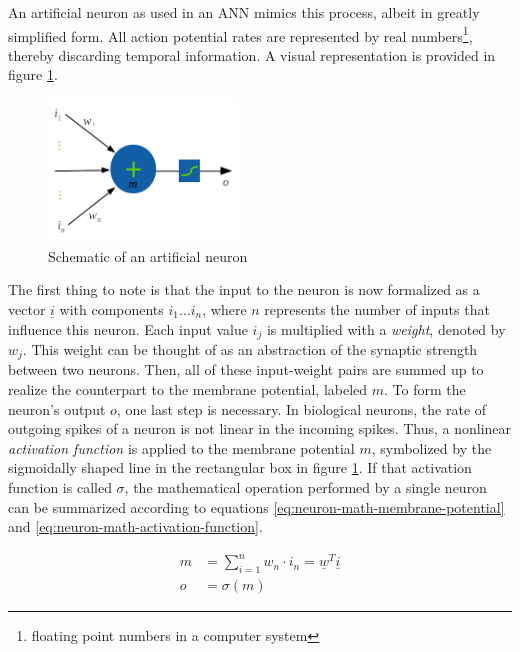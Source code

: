 \documentclass[11pt, a4paper]{article}
\newcommand\braces[1]{\left(#1\right)}
\renewcommand{\vec}[1]{\underline{#1}}
\begin{document}
An artificial neuron as used in an ANN mimics this process, albeit in greatly simplified form. All action potential rates are represented by real numbers\footnote{floating point numbers in a computer system}, thereby discarding temporal information. A visual representation is provided in figure \ref{fig:artificial-neuron-schematic}.


\begin{figure}[h!tb]
	\centering
	\includegraphics[width=0.45\textwidth]{images/artificial_neuron.png}
	\caption[Artificial neuron]{Schematic of an artificial neuron}
	\label{fig:artificial-neuron-schematic}
\end{figure}

The first thing to note is that the input to the neuron is now formalized as a vector $\vec{i}$ with components $i_1 \dots i_n$, where $n$ represents the number of inputs that influence this neuron. Each input value $i_j$ is multiplied with a \emph{weight}, denoted by $w_j$. This weight can be thought of as an abstraction of the synaptic strength between two neurons. Then, all of these input-weight pairs are summed up to realize the counterpart to the membrane potential, labeled $m$. To form the neuron's output $o$, one last step is necessary. In biological neurons, the rate of outgoing spikes of a neuron is not linear in the incoming spikes. Thus, a nonlinear \emph{activation function} is applied to the membrane potential $m$, symbolized by the sigmoidally shaped line in the rectangular box in figure \ref{fig:artificial-neuron-schematic}. If that activation function is called $\sigma$, the mathematical operation performed by a single neuron can be summarized according to equations \eqref{eq:neuron-math-membrane-potential} and \eqref{eq:neuron-math-activation-function}.

\begin{align}
	m &= \sum_{i=1}^n w_n \cdot i_n = \vec{w}^T \vec{i} \label{eq:neuron-math-membrane-potential} \\
	o &= \sigma \braces{m} \label{eq:neuron-math-activation-function}
\end{align}
\end{document}

